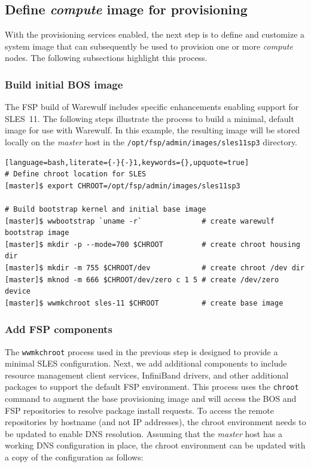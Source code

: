 \documentclass[letterpaper]{article}
\begin{document}
\subsection{Define {\em compute} image for provisioning}

With the provisioning services enabled, the next step is to define and
customize a system image that can subsequently be used to provision one or more
{\em compute} nodes. The following subsections highlight this process.

\subsubsection{Build initial BOS image}

The FSP build of Warewulf includes specific enhancements enabling support for
SLES~11. The following steps illustrate the process to build a minimal, default
image for use with Warewulf. In this example, the resulting image will be
stored locally on the {\em master} host in the
\texttt{/opt/fsp/admin/images/sles11sp3} directory.

\begin{lstlisting}[language=bash,literate={-}{-}1,keywords={},upquote=true]
# Define chroot location for SLES 
[master]$ export CHROOT=/opt/fsp/admin/images/sles11sp3

# Build bootstrap kernel and initial base image
[master]$ wwbootstrap `uname -r`              # create warewulf bootstrap image
[master]$ mkdir -p --mode=700 $CHROOT         # create chroot housing dir
[master]$ mkdir -m 755 $CHROOT/dev            # create chroot /dev dir
[master]$ mknod -m 666 $CHROOT/dev/zero c 1 5 # create /dev/zero device
[master]$ wwmkchroot sles-11 $CHROOT          # create base image

\end{lstlisting}

\subsubsection{Add FSP components}

The \texttt{wwmkchroot} process used in the previous step is designed to
provide a minimal SLES configuration. Next, we add additional components to
include resource management client services, InfiniBand drivers, and other
additional packages to support the default FSP environment.  This process uses
the \texttt{chroot} command to augment the base provisioning image and will
access the BOS and FSP repositories to resolve package install requests. To
access the remote repositories by hostname (and not IP addresses), the chroot
environment needs to be updated to enable DNS resolution. Assuming that
the {\em master} host has a working DNS configuration in place, the chroot environment can
be updated with a copy of the configuration as follows:
\end{document}
